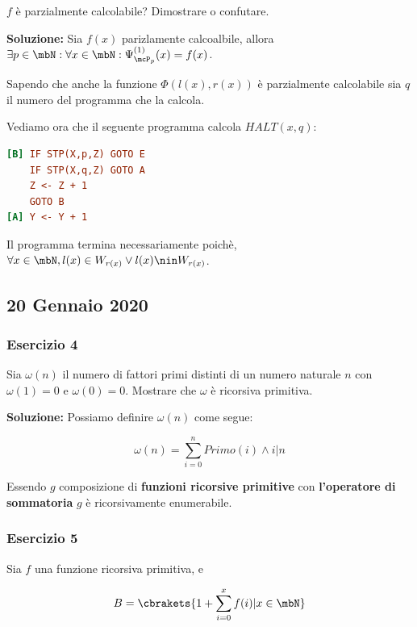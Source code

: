 \(f\) è parzialmente calcolabile? Dimostrare o confutare.

\textbf{Soluzione: } Sia \(f(x)\) parizlamente calcoalbile, allora \(\exists p \in \mbN: \forall x \in \mbN :\Psi_{\mcP_p}^{(1)}(x)=f(x)\).

Sapendo che anche la funzione \(\Phi(l(x), r(x))\) è parzialmente calcolabile sia \(q\) il numero del programma che la calcola.

Vediamo ora che il seguente programma calcola \(\textit{HALT}(x,q)\):

\begin{lstlisting}[language=ini, caption={ }]
[B] IF STP(X,p,Z) GOTO E
    IF STP(X,q,Z) GOTO A
    Z <- Z + 1
    GOTO B
[A] Y <- Y + 1
\end{lstlisting}

Il programma termina necessariamente poichè, \(\forall x \in \mbN, l(x) \in W_{r(x)} \lor l(x) \nin W_{r(x)}\).

\subsection{20 Gennaio 2020}

\subsubsection{Esercizio 4}

Sia \(\omega(n)\) il numero di fattori primi distinti di un numero naturale \(n\) con \(\omega(1)=0\) e \(\omega(0)=0\). Mostrare che \(\omega\) è ricorsiva primitiva.

\textbf{Soluzione:} Possiamo definire \(\omega(n)\) come segue:

\begin{equation}
  \omega(n) = \sum_{i=0}^{n} Primo(i) \land i\vert n
\end{equation}

Essendo \(g\) composizione di \textbf{funzioni ricorsive primitive} con \textbf{l'operatore di sommatoria} \(g\) è ricorsivamente enumerabile.

\subsubsection{Esercizio 5}

Sia \(f\) una funzione ricorsiva primitiva, e

\begin{equation}
  B=\cbrakets{1+\sum_{i=0}^{x} f(i) \vert x \in \mbN}
\end{equation}

